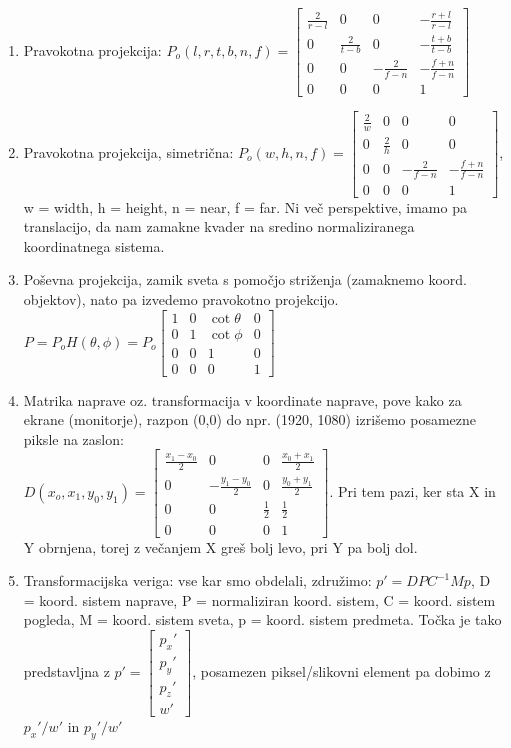 \documentclass{article}
\begin{document}
\begin{itemize}
\begin{enumerate}
        \item Pravokotna projekcija: $P_o(l,r,t,b,n,f) = \begin{bmatrix} \frac{2}{r-l} & 0 & 0 & -\frac{r+l}{r-l} \\ 0 & \frac{2}{t-b} & 0 & -\frac{t+b}{t-b} \\ 0 & 0 & -\frac{2}{f-n} & -\frac{f+n}{f-n} \\ 0 & 0 & 0 & 1 \end{bmatrix}$
        \item Pravokotna projekcija, simetrična: $P_o(w,h,n,f) = \begin{bmatrix} \frac{2}{w} & 0 & 0 & 0 \\ 0 & \frac{2}{h} & 0 & 0 \\ 0 & 0 & -\frac{2}{f-n} & -\frac{f+n}{f-n} \\ 0 & 0 & 0 & 1 \end{bmatrix}$, w = width, h = height, n = near, f = far. Ni več perspektive, imamo pa translacijo, da nam zamakne kvader na sredino normaliziranega koordinatnega sistema.
        \item Poševna projekcija, zamik sveta s pomočjo striženja (zamaknemo koord. objektov), nato pa izvedemo pravokotno projekcijo. $P = P_oH(\theta, \phi) = P_o \begin{bmatrix} 1 & 0 & \cot{\theta} & 0 \\ 0 & 1 & \cot{\phi} & 0 \\ 0 & 0 & 1 & 0 \\ 0 & 0 & 0 & 1 \end{bmatrix}$
        \item Matrika naprave oz. transformacija v koordinate naprave, pove kako za ekrane (monitorje), razpon (0,0) do npr. (1920, 1080) izrišemo posamezne piksle na zaslon: \\ $D(x_o, x_1, y_0, y_1) = \begin{bmatrix} \frac{x_1 - x_0}{2} & 0 & 0 & \frac{x_0 + x_1}{2} \\ 0 & -\frac{y_1 - y_0}{2} & 0 & \frac{y_0 + y_1}{2} \\ 0 & 0 & \frac{1}{2} & \frac{1}{2} \\ 0 & 0 & 0 & 1 \end{bmatrix}$. Pri tem pazi, ker sta X in Y obrnjena, torej z večanjem X greš bolj levo, pri Y pa bolj dol.
        \item Transformacijska veriga: vse kar smo obdelali, združimo: $p' = DPC^{-1}Mp$, D = koord. sistem naprave, P = normaliziran koord. sistem, C = koord. sistem pogleda, M = koord. sistem sveta, p = koord. sistem predmeta. Točka je tako predstavljna z $p' = \begin{bmatrix} p_x' \\ p_y' \\ p_z' \\ w' \end{bmatrix}$, posamezen piksel/slikovni element pa dobimo z $p_x'/w'$ in $ p_y'/w'$
    \end{enumerate}
\end{itemize}
\end{document}
